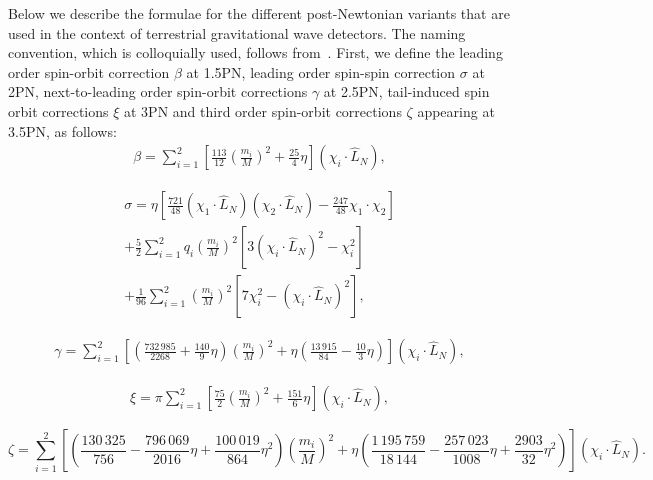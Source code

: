 Below we describe the formulae for the different post-Newtonian variants
that are used in the context of terrestrial gravitational wave detectors.
The naming convention, which is colloquially used, follows 
from~\cite{Damour:2000zb}. First, we define the leading order spin-orbit
correction $\beta$ at 1.5PN, leading order spin-spin correction $\sigma$ 
at 2PN, next-to-leading order spin-orbit corrections $\gamma$ at 2.5PN, 
tail-induced spin orbit corrections $\xi$ at 3PN and third order spin-orbit
corrections $\zeta$ appearing at 3.5PN, as follows:
%
%
\begin{eqnarray}
%
\beta =  \sum_{i=1}^2 \left[ \frac{113}{12} \left(\frac{m_i}{M}\right)^2 + \frac{25}{4}\eta \right] \left(\chi_i \cdot
\hat{L}_N\right) ,
%
\end{eqnarray}

\begin{eqnarray}
\sigma = \eta \left[ \frac{721}{48} \left( \chi_1 \cdot \hat{L}_N\right) \left( \chi_2 \cdot \hat{L}_N\right) 
- \frac{247}{48} \chi_1 \cdot \chi_2 \right]\nonumber\\
+\frac{5}{2} \sum_{i=1}^2 q_i \left( \frac{m_i}{M}\right)^2 
\left[ 3 \left( \chi_i \cdot \hat{L}_N \right)^2 - \chi_i^2 \right] \nonumber\\
+ \frac{1}{96} \sum_{i=1}^2 \left( \frac{m_i}{M}\right)^2 \left[ 7 \chi_i^2 - \left( \chi_i \cdot \hat{L}_N \right)^2 \right] ,
\end{eqnarray}

\begin{eqnarray}
 \gamma = \sum_{i=1}^2 \left[  \left( \frac{732\,985}{2268} + \frac{140}{9}\eta\right) \left(\frac{m_i}{M}\right)^2 
 + \eta \left(\frac{13\,915}{84} - \frac{10}{3}\eta \right) \right] \left( \chi_i \cdot \hat{L}_N\right) ,
 \end{eqnarray}

\begin{eqnarray}
\xi = \pi \sum_{i=1}^2 \left[ \frac{75}{2} \left(\frac{m_i}{M}\right)^2 + \frac{151}{6} \eta \right] 
\left( \chi_i \cdot \hat{L}_N \right) ,
\end{eqnarray}

{\footnotesize \begin{equation}
\zeta = \sum_{i=1}^2 \left[ \left( \frac{130\,325}{756} - \frac{796\,069}{2016}\eta + \frac{100\,019}{864}\eta^2\right) 
\left(\frac{m_i}{M}\right)^2 + \eta \left(\frac{1\,195\,759}{18\,144} - \frac{257\,023}{1008}\eta + \frac{2903}{32}\eta^2\right) 
\right] \left( \chi_i \cdot \hat{L}_N \right) .
\end{equation}}


